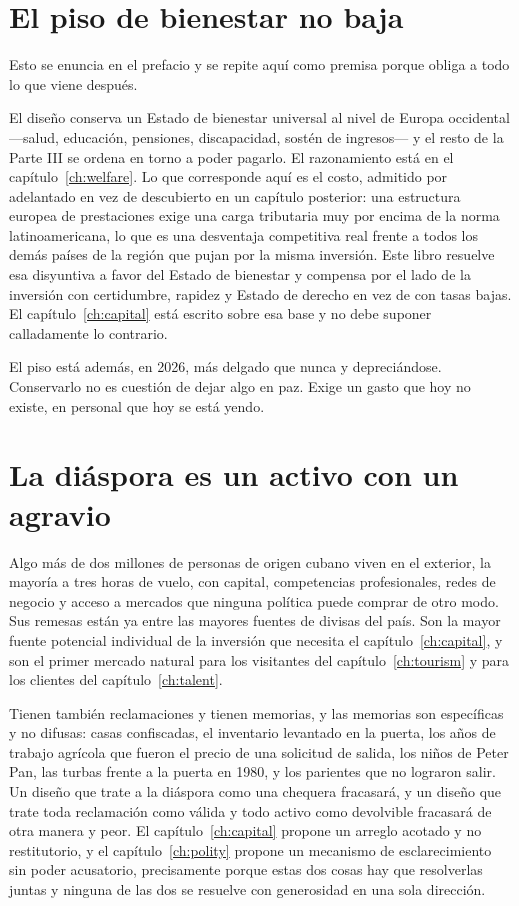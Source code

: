 \section{El piso de bienestar no baja}

Esto se enuncia en el prefacio y se repite aquí como premisa porque obliga a todo
lo que viene después.

El diseño conserva un Estado de bienestar universal al nivel de Europa occidental
---salud, educación, pensiones, discapacidad, sostén de ingresos--- y el resto de
la Parte III se ordena en torno a poder pagarlo. El razonamiento está en el
capítulo~\ref{ch:welfare}. Lo que corresponde aquí es el costo, admitido por
adelantado en vez de descubierto en un capítulo posterior: una estructura europea
de prestaciones exige una carga tributaria muy por encima de la norma
latinoamericana, lo que es una desventaja competitiva real frente a todos los demás
países de la región que pujan por la misma inversión. Este libro resuelve esa
disyuntiva a favor del Estado de bienestar y compensa por el lado de la inversión
con certidumbre, rapidez y Estado de derecho en vez de con tasas bajas. El
capítulo~\ref{ch:capital} está escrito sobre esa base y no debe suponer calladamente
lo contrario.

El piso está además, en 2026, más delgado que nunca y depreciándose. Conservarlo no
es cuestión de dejar algo en paz. Exige un gasto que hoy no existe, en personal que
hoy se está yendo.

\section{La diáspora es un activo con un agravio}

Algo más de dos millones de personas de origen cubano viven en el exterior, la
mayoría a tres horas de vuelo, con capital, competencias profesionales, redes de
negocio y acceso a mercados que ninguna política puede comprar de otro modo. Sus
remesas están ya entre las mayores fuentes de divisas del país. Son la mayor fuente
potencial individual de la inversión que necesita el capítulo~\ref{ch:capital}, y
son el primer mercado natural para los visitantes del capítulo~\ref{ch:tourism} y
para los clientes del capítulo~\ref{ch:talent}.

Tienen también reclamaciones y tienen memorias, y las memorias son específicas y no
difusas: casas confiscadas, el inventario levantado en la puerta, los años de
trabajo agrícola que fueron el precio de una solicitud de salida, los niños de
Peter Pan, las turbas frente a la puerta en 1980, y los parientes que no lograron
salir. Un diseño que trate a la diáspora como una chequera fracasará, y un diseño
que trate toda reclamación como válida y todo activo como devolvible fracasará de
otra manera y peor. El capítulo~\ref{ch:capital} propone un arreglo acotado y no
restitutorio, y el capítulo~\ref{ch:polity} propone un mecanismo de esclarecimiento
sin poder acusatorio, precisamente porque estas dos cosas hay que resolverlas
juntas y ninguna de las dos se resuelve con generosidad en una sola dirección.

